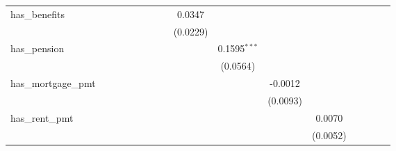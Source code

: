 \begin{table}[htbp]
\begin{tiny}
\begin{tabular}{lccccccccccccccc}
         has\_benefits           &                 &                 &                 &                 &                 &                 &                 & 0.0347          &                 &                 &                 &                 &                 &                 &   \\
                                  &                 &                 &                 &                 &                 &                 &                 & (0.0229)        &                 &                 &                 &                 &                 &                 &   \\
         has\_pension            &                 &                 &                 &                 &                 &                 &                 &                 & 0.1595$^{***}$  &                 &                 &                 &                 &                 &   \\
                                  &                 &                 &                 &                 &                 &                 &                 &                 & (0.0564)        &                 &                 &                 &                 &                 &   \\
         has\_mortgage\_pmt     &                 &                 &                 &                 &                 &                 &                 &                 &                 & -0.0012         &                 &                 &                 &                 &   \\
                                  &                 &                 &                 &                 &                 &                 &                 &                 &                 & (0.0093)        &                 &                 &                 &                 &   \\
         has\_rent\_pmt         &                 &                 &                 &                 &                 &                 &                 &                 &                 &                 & 0.0070          &                 &                 &                 &   \\
                                  &                 &                 &                 &                 &                 &                 &                 &                 &                 &                 & (0.0052)        &                 &                 &                 &   \\

\end{tabular}
\end{tiny}
\end{table}

